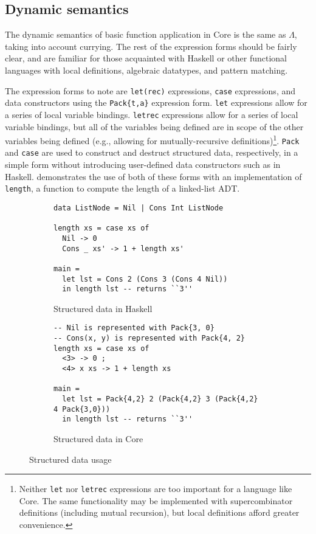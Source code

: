 \subsection{Dynamic semantics}
\label{sec:dynamic-semantics}

The dynamic semantics of basic function application in Core is the same as $\Lambda$, taking into account currying. The rest of the expression forms should be fairly clear, and are familiar for those acquainted with Haskell or other functional languages with local definitions, algebraic datatypes, and pattern matching.

The expression forms to note are \texttt{let(rec)} expressions, \texttt{case} expressions, and data constructors using the \texttt{Pack\{t,a\}} expression form. \texttt{let} expressions allow for a series of local variable bindings. \texttt{letrec} expressions allow for a series of local variable bindings, but all of the variables being defined are in scope of the other variables being defined (e.g., allowing for mutually-recursive definitions)\footnote{Neither \texttt{let} nor \texttt{letrec} expressions are too important for a language like Core. The same functionality may be implemented with supercombinator definitions (including mutual recursion), but local definitions afford greater convenience.}. \texttt{Pack} and \texttt{case} are used to construct and destruct structured data, respectively, in a simple form without introducing user-defined data constructors such as in Haskell.  demonstrates the use of both of these forms with an implementation of \texttt{length}, a function to compute the length of a linked-list ADT.

\begin{figure}
  \begin{subfigure}{\textwidth}
    \begin{verbatim}
data ListNode = Nil | Cons Int ListNode

length xs = case xs of
  Nil -> 0
  Cons _ xs' -> 1 + length xs'

main =
  let lst = Cons 2 (Cons 3 (Cons 4 Nil))
  in length lst -- returns ``3''
    \end{verbatim}
    \caption{Structured data in Haskell}
  \end{subfigure}
  \begin{subfigure}{\textwidth}
    \begin{verbatim}
-- Nil is represented with Pack{3, 0}
-- Cons(x, y) is represented with Pack{4, 2}
length xs = case xs of
  <3> -> 0 ;
  <4> x xs -> 1 + length xs

main =
  let lst = Pack{4,2} 2 (Pack{4,2} 3 (Pack{4,2} 4 Pack{3,0}))
  in length lst -- returns ``3''
    \end{verbatim}
    \caption{Structured data in Core}
  \end{subfigure}
  \caption{Structured data usage}
  \label{fig:structured-data-example}
\end{figure}

